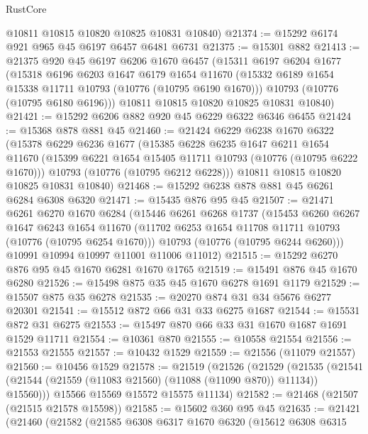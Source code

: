 \begin{lexlean}{RustCore}
\begin{coremodule}
      @10811
      @10815
      @10820
      @10825
      @10831
      @10840)
@21374 := @15292 @6174 @921 @965 @45 @6197 @6457 @6481 @6731
@21375 := @15301 @882
@21413 := @21375
    @920
    @45
    @6197
    @6206
    @1670
    @6457
    (@15311
      @6197
      @6204
      @1677
      (@15318
        @6196
        @6203
        @1647
        @6179
        @1654
        @11670
        (@15332 @6189 @1654 @15338 @11711 @10793 (@10776 (@10795 @6190 @1670)))
        @10793
        (@10776 (@10795 @6180 @6196)))
      @10811
      @10815
      @10820
      @10825
      @10831
      @10840)
@21421 := @15292 @6206 @882 @920 @45 @6229 @6322 @6346 @6455
@21424 := @15368 @878 @881 @45
@21460 := @21424
    @6229
    @6238
    @1670
    @6322
    (@15378
      @6229
      @6236
      @1677
      (@15385
        @6228
        @6235
        @1647
        @6211
        @1654
        @11670
        (@15399 @6221 @1654 @15405 @11711 @10793 (@10776 (@10795 @6222 @1670)))
        @10793
        (@10776 (@10795 @6212 @6228)))
      @10811
      @10815
      @10820
      @10825
      @10831
      @10840)
@21468 := @15292 @6238 @878 @881 @45 @6261 @6284 @6308 @6320
@21471 := @15435 @876 @95 @45
@21507 := @21471
    @6261
    @6270
    @1670
    @6284
    (@15446
      @6261
      @6268
      @1737
      (@15453
        @6260
        @6267
        @1647
        @6243
        @1654
        @11670
        (@11702 @6253 @1654 @11708 @11711 @10793 (@10776 (@10795 @6254 @1670)))
        @10793
        (@10776 (@10795 @6244 @6260)))
      @10991
      @10994
      @10997
      @11001
      @11006
      @11012)
@21515 := @15292 @6270 @876 @95 @45 @1670 @6281 @1670 @1765
@21519 := @15491 @876 @45 @1670 @6280
@21526 := @15498 @875 @35 @45 @1670 @6278 @1691 @1179
@21529 := @15507 @875 @35 @6278
@21535 := @20270 @874 @31 @34 @5676 @6277 @20301
@21541 := @15512 @872 @66 @31 @33 @6275 @1687
@21544 := @15531 @872 @31 @6275
@21553 := @15497 @870 @66 @33 @31 @1670 @1687 @1691 @1529 @11711
@21554 := @10361 @870
@21555 := @10558 @21554
@21556 := @21553 @21555
@21557 := @10432 @1529
@21559 := @21556 (@11079 @21557)
@21560 := @10456 @1529
@21578 := @21519
    (@21526
      (@21529
        (@21535 (@21541 (@21544 (@21559 (@11083 @21560) (@11088 (@11090 @870)) @11134)) @15560)))
      @15566
      @15569
      @15572
      @15575
      @11134)
@21582 := @21468 (@21507 (@21515 @21578 @15598))
@21585 := @15602 @360 @95 @45
@21635 := @21421
    (@21460
      (@21582
        (@21585
          @6308
          @6317
          @1670
          @6320
          (@15612
            @6308
            @6315

\end{coremodule}
\end{lexlean}
